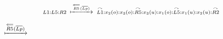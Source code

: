 \begin{frame}{\name}
$$\scriptstyle
L1:L5:R2\enspace\xmapsto{\overset\Longleftarrow{R5}(\overline{Lp})}\enspace\stackrel\curvearrowright{L1}:x_2(o):{x_3(o):\stackrel\curvearrowright{R5}:x_3(u)}:x_1(o):\stackrel\curvearrowright{L5}:x_1(u):x_2(u):\stackrel\curvearrowright{R2}
$$

\begin{center}
$\xmapsto{\overset\Longleftarrow{R5}(\overline{Lp})}$
\end{center}
\end{frame}
